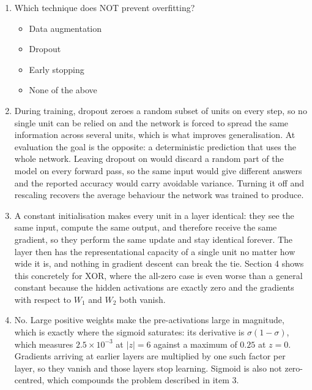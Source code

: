 \documentclass[11pt]{article}
\begin{document}
\begin{enumerate}
  \item Which technique does NOT prevent overfitting?
        \begin{itemize}
          \item[{[\ ]}] Data augmentation \quad
          \item[{[\ ]}] Dropout \quad
          \item[{[\ ]}] Early stopping \quad
          \item[{[X]}] None of the above
        \end{itemize}

  \item During training, dropout zeroes a random subset of units on every step, so no single unit can
        be relied on and the network is forced to spread the same information across several units,
        which is what improves generalisation. At evaluation the goal is the opposite: a deterministic
        prediction that uses the whole network. Leaving dropout on would discard a random part of the
        model on every forward pass, so the same input would give different answers and the reported
        accuracy would carry avoidable variance. Turning it off and rescaling recovers the average
        behaviour the network was trained to produce.

  \item A constant initialisation makes every unit in a layer identical: they see the same input, compute
        the same output, and therefore receive the same gradient, so they perform the same update and stay
        identical forever. The layer then has the representational capacity of a single unit no matter how
        wide it is, and nothing in gradient descent can break the tie. Section 4 shows this concretely for
        XOR, where the all-zero case is even worse than a general constant because the hidden activations
        are exactly zero and the gradients with respect to $W_1$ and $W_2$ both vanish.

  \item No. Large positive weights make the pre-activations large in magnitude, which is exactly where the
        sigmoid saturates: its derivative is $\sigma(1-\sigma)$, which measures $2.5\times10^{-3}$ at $|z| = 6$ against a maximum of $0.25$ at $z = 0$. Gradients arriving at earlier layers are
        multiplied by one such factor per layer, so they vanish and those layers stop learning. Sigmoid is
        also not zero-centred, which compounds the problem described in item 3.


\end{enumerate}
\end{document}
